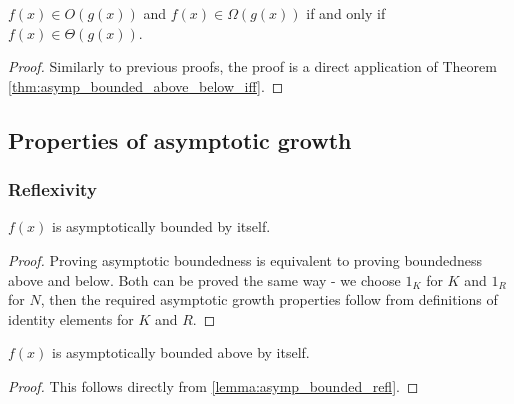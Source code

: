 \begin{theorem}
    \label{thm:big_o_and_omega_iff_theta}
    \leanok
    $f(x) \in O(g(x))$ and $f(x) \in \Omega(g(x))$ if and only if $f(x) \in \Theta(g(x))$.
\end{theorem}

\begin{proof}
    \leanok
    Similarly to previous proofs, the proof is a direct application of Theorem 
    \ref{thm:asymp_bounded_above_below_iff}.
\end{proof}


\subsection{Properties of asymptotic growth}

\subsubsection{Reflexivity}

\begin{lemma}
    \label{lemma:asymp_bounded_refl}
    \leanok
    $f(x)$ is asymptotically bounded by itself. 

\end{lemma}

\begin{proof}
    \leanok
    Proving asymptotic boundedness is equivalent to proving boundedness above and below.
    Both can be proved the same way - we choose $1_K$ for $K$ and $1_R$ for $N$, then the
    required asymptotic growth properties follow from definitions of identity elements for 
    $K$ and $R$.
\end{proof}

\begin{lemma}
    \label{lemma:asymp_bounded_above_refl}
    \leanok
    $f(x)$ is asymptotically bounded above by itself.

\end{lemma}

\begin{proof}
    \leanok
    This follows directly from \ref{lemma:asymp_bounded_refl}.
\end{proof}

